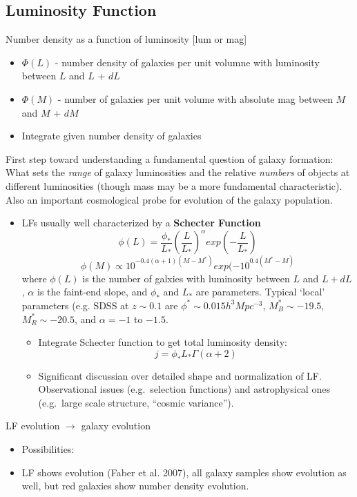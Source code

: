 \documentclass[12pt]{article}
\begin{document}
\subsection*{Luminosity Function}
Number density as a function of luminosity [lum or mag]
\begin{itemize}
    \item $\Phi(L)$ - number density of galaxies per unit volumne with
      luminosity between $L$ and $L$ + $dL$
    \item $\Phi(M)$ - number of galaxies per unit volume with absolute
      mag between $M$ and $M$ + $dM$
    \item Integrate given number density of galaxies
\end{itemize}
First step toward understanding a fundamental question of galaxy formation: What
    sets the \emph{range} of galaxy luminosities and the relative
    \emph{numbers} of objects at different luminosities (though mass
    may be a more fundamental characteristic). Also an important
    cosmological probe for evolution of the galaxy population.

\begin{itemize}
      \item LFs usually well characterized by a \textbf{Schecter Function}
          \begin{equation}
              \phi(L) =
              \frac{\phi_*}{L_*}(\frac{L}{L_*})^{\alpha}exp(-\frac{L}{L_*})
          \end{equation}
          \begin{equation}
            \phi(M) \propto 10^{-0.4(\alpha+1)(M-M^*)}exp(-10^{0.4(M^*-M)}
          \end{equation}
      where $\phi(L)$ is the number of galxies with luminosity between
      $L$ and $L + dL$, $\alpha$ is the faint-end slope, and $\phi_*$
      and $L_*$ are parameters. Typical `local' parameters (e.g. SDSS
      at $z \sim 0.1$ are $\phi^*\sim0.015h^3Mpc^{-3}$,
      $M_B^*\sim-19.5$, $M_R^*\sim-20.5$, and $\alpha=-1$ to $-1.5$.
      \begin{itemize}
        \item Integrate Schecter function to get total luminosity
            density:
            \begin{equation}
              j = \phi_*L_*\Gamma(\alpha + 2)
            \end{equation}
        \item Significant discussian over detailed shape and
            normalization of LF\@. Observational issues (e.g.\ selection
            functions) and astrophysical ones (e.g.\ large scale structure,
            ``cosmic variance'').
      \end{itemize}
\end{itemize}
LF evolution $\rightarrow$ galaxy evolution
\begin{itemize}
      \item Possibilities:
      \item LF shows evolution (Faber et al. 2007), all galaxy samples
          show evolution as well, but red galaxies show number density
          evolution.
\end{itemize}
\end{document}
